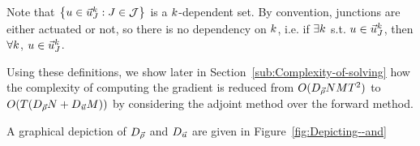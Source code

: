 Note that $\left\{ \convar\in\junccon{\jn}{\tind}:\jn\in\jns\right\} $
is a $k$-dependent set. By convention, junctions are either actuated
or not, so there is no dependency on $k$, i.e. if $\exists k$
s.t. $u\in\vec{u}_{J}^{k}$, then $\forall k$, $u\in\vec{u}_{J}^{k}$.

Using these definitions, we show later in Section~\ref{sub:Complexity-of-solving}
how the complexity of computing the gradient is reduced from $O(D_{\vec{\rho}}NMT^{2})$
to $O(\ntime\left(\degree{\state}\nlinks+\degree{\control}\ncontrols\right))$
by considering the adjoint method over the forward method.

A graphical depiction of $D_{\vec{\rho}}$ and $D_{\vec{u}}$ are given
in Figure~\ref{fig:Depicting--and}
\begin{figure}
\begin{centering}
\end{centering}
\end{figure}
